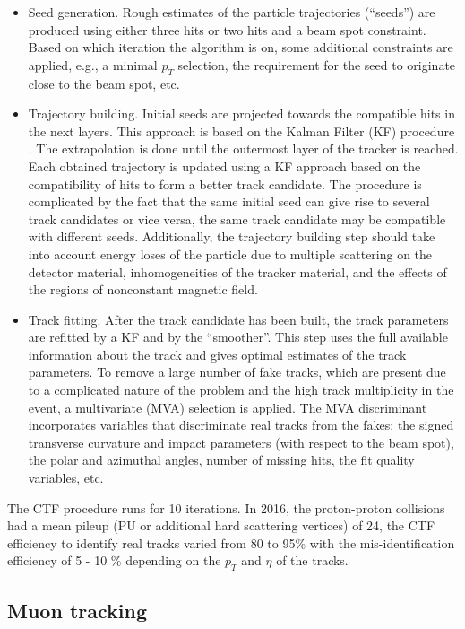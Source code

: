 \begin{itemize}
\item Seed generation. Rough estimates of the particle trajectories (``seeds'') are produced using either three hits or two hits and a beam spot constraint. Based on which iteration the algorithm is on, some additional constraints are applied, e.g., a minimal $p_T$ selection, the requirement for the seed to originate close to the beam spot, etc. 
\item Trajectory building. Initial seeds are projected towards the compatible hits in the next layers. This approach is based on the Kalman Filter (KF) procedure \cite{Kalman_filter}. The extrapolation is done until the outermost layer of the tracker is reached. Each obtained trajectory is updated using a KF approach based on the compatibility of hits to form a better track candidate. The procedure is complicated by the fact that the same initial seed can give rise to several track candidates or vice versa, the same track candidate may be compatible with different seeds. Additionally, the trajectory building step should take into account energy loses of the particle due to multiple scattering on the detector material, inhomogeneities of the tracker material, and the effects of the regions of nonconstant magnetic field. 
\item Track fitting. After the track candidate has been built, the track parameters are refitted by a KF and by the ``smoother''. This step uses the full available information about the track and gives optimal estimates of the track parameters. To remove a large number of fake tracks, which are present due to a  complicated nature of the problem and the high track multiplicity in the event, a multivariate (MVA) selection is applied. The MVA discriminant incorporates variables that discriminate real tracks from the fakes: the signed transverse curvature and impact parameters (with respect to the beam spot), the polar and azimuthal angles, number of missing hits, the fit quality variables, etc. 
\end{itemize}

The CTF procedure runs for 10 iterations. In 2016, the proton-proton collisions had a mean pileup (PU or additional hard scattering vertices) of 24, the CTF efficiency to identify real tracks varied from 80 to 95$\%$ with the mis-identification efficiency of 5 - 10 $\%$ depending on the $p_T$ and $\eta$ of the tracks.

\subsection{Muon tracking}\label{sec:muon_track_reconstruction}

